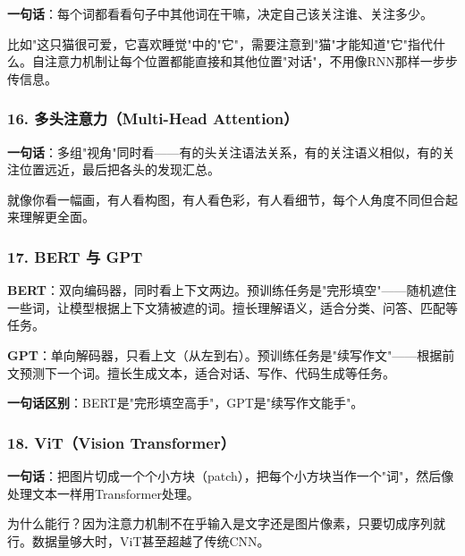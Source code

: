 \documentclass[12pt,a4paper]{ctexart}
\begin{document}
\begin{funbox}
\textbf{一句话}：每个词都看看句子中其他词在干嘛，决定自己该关注谁、关注多少。

比如"这只猫很可爱，它喜欢睡觉"中的"它"，需要注意到"猫"才能知道"它"指代什么。自注意力机制让每个位置都能直接和其他位置"对话"，不用像RNN那样一步步传信息。
\end{funbox}

\subsubsection{16. 多头注意力（Multi-Head Attention）}

\begin{funbox}
\textbf{一句话}：多组"视角"同时看——有的头关注语法关系，有的关注语义相似，有的关注位置远近，最后把各头的发现汇总。

就像你看一幅画，有人看构图，有人看色彩，有人看细节，每个人角度不同但合起来理解更全面。
\end{funbox}

\subsubsection{17. BERT 与 GPT}

\begin{funbox}
\textbf{BERT}：双向编码器，同时看上下文两边。预训练任务是"完形填空"——随机遮住一些词，让模型根据上下文猜被遮的词。擅长理解语义，适合分类、问答、匹配等任务。

\textbf{GPT}：单向解码器，只看上文（从左到右）。预训练任务是"续写作文"——根据前文预测下一个词。擅长生成文本，适合对话、写作、代码生成等任务。

\textbf{一句话区别}：BERT是"完形填空高手"，GPT是"续写作文能手"。
\end{funbox}

\subsubsection{18. ViT（Vision Transformer）}

\begin{funbox}[ViT]
\textbf{一句话}：把图片切成一个个小方块（patch），把每个小方块当作一个"词"，然后像处理文本一样用Transformer处理。

为什么能行？因为注意力机制不在乎输入是文字还是图片像素，只要切成序列就行。数据量够大时，ViT甚至超越了传统CNN。
\end{funbox}
\end{document}
